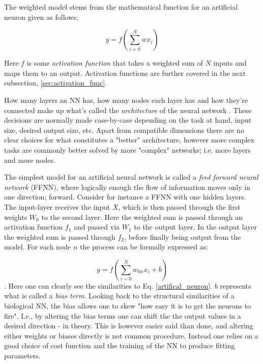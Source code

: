 The weighted model stems from the mathematical function for an artificial neuron given as follows; 

\begin{equation}\label{artifical_neuron}
    y = f\left( \sum_{i=0}^Nwx_i \right) 
\end{equation}

Here $f$ is some \textit{activation function} that takes a weighted sum of $N$ inputs and maps them to an output. Activation functions are further covered in the next subsection, \ref{sec:activation_func}.

How many layers an NN has, how many nodes each layer has and how they're connected make up what's called the \textit{architecture} of the neural network \citep[Ch.1]{nielsen}. These decisions are normally made case-by-case depending on the task at hand, input size, desired output size, etc. Apart from compatible dimensions there are no clear choices for what constitutes a "better" architecture, however more complex tasks are commonly better solved by more "complex" networks; i.e. more layers and more nodes. 

The simplest model for an artificial neural network is called a \textit{feed forward neural network} (FFNN), where logically enough the flow of information moves only in one direction; forward. Consider for instance a FFNN with one hidden layers. The input-layer receives the input $X$, which is then passed through the first weights $W_0$ to the second layer. Here the weighted sum is passed through an activation function $f_1$ and passed via $W_1$ to the output layer. In the output layer the weighted sum is passed through $f_2$, before finally being output from the model. 
For each node $n$ the process can be formally expressed as:


\begin{equation}
    y = f\left( \sum_{i=0}^N w_{0n}x_i + b\right)
\end{equation}
\citep[p.17]{Ketkar2017}. Here one can clearly see the similarities to Eq. \ref{artifical_neuron}. $b$ represents what is called a \textit{bias term}. Looking back to the structural similarities of a biological NN, the bias allows one to skew "how easy it is to get the neurons to fire". I.e., by altering the bias terms one can shift the the output values in a desired direction - in theory. This is however easier said than done, and altering either weights or biases directly is not common procedure. Instead one relies on a good choice of cost function and the training of the NN to produce fitting parameters. 


